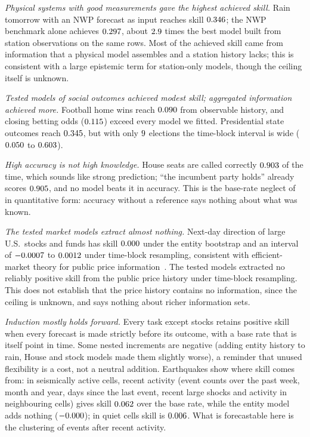 \documentclass[journal]{IEEEtran}
\theoremstyle{definition}
\begin{document}
\emph{Physical systems with good measurements gave the highest achieved skill.} Rain tomorrow with an NWP forecast as input reaches skill $0.346$; the NWP benchmark alone achieves $0.297$, about $2.9$ times the best model built from station observations on the same rows. Most of the achieved skill came from information that a physical model assembles and a station history lacks; this is consistent with a large epistemic term for station-only models, though the ceiling itself is unknown.

\emph{Tested models of social outcomes achieved modest skill; aggregated information achieved more.} Football home wins reach $0.090$ from observable history, and closing betting odds ($0.115$) exceed every model we fitted. Presidential state outcomes reach $0.345$, but with only $9$ elections the time-block interval is wide ($0.050$ to $0.603$).

\emph{High accuracy is not high knowledge.} House seats are called correctly $0.903$ of the time, which sounds like strong prediction; ``the incumbent party holds'' already scores $0.905$, and no model beats it in accuracy. This is the base-rate neglect of~\cite{kahneman1973psychology} in quantitative form: accuracy without a reference says nothing about what was known.

\emph{The tested market models extract almost nothing.} Next-day direction of large U.S.\ stocks and funds has skill $0.000$ under the entity bootstrap and an interval of $-0.0007$ to $0.0012$ under time-block resampling, consistent with efficient-market theory for public price information~\cite{fama1970efficient}. The tested models extracted no reliably positive skill from the public price history under time-block resampling. This does not establish that the price history contains no information, since the ceiling is unknown, and says nothing about richer information sets.

\emph{Induction mostly holds forward.} Every task except stocks retains positive skill when every forecast is made strictly before its outcome, with a base rate that is itself point in time. Some nested increments are negative (adding entity history to rain, House and stock models made them slightly worse), a reminder that unused flexibility is a cost, not a neutral addition. Earthquakes show where skill comes from: in seismically active cells, recent activity (event counts over the past week, month and year, days since the last event, recent large shocks and activity in neighbouring cells) gives skill $0.062$ over the base rate, while the entity model adds nothing ($-0.000$); in quiet cells skill is $0.006$. What is forecastable here is the clustering of events after recent activity.
\end{document}
